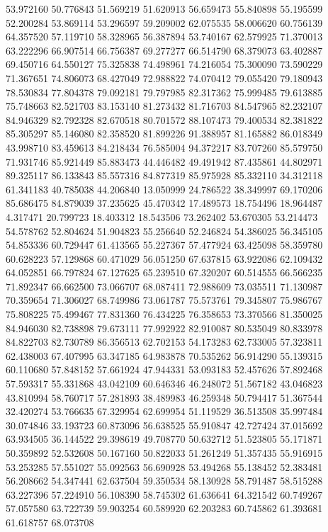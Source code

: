 53.972160
50.776843
51.569219
51.620913
56.659473
55.840898
55.195599
52.200284
53.869114
53.296597
59.209002
62.075535
58.006620
60.756139
64.357520
57.119710
58.328965
56.387894
53.740167
62.579925
71.370013
63.222296
66.907514
66.756387
69.277277
66.514790
68.379073
63.402887
69.450716
64.550127
75.325838
74.498961
74.216054
75.300090
73.590229
71.367651
74.806073
68.427049
72.988822
74.070412
79.055420
79.180943
78.530834
77.804378
79.092181
79.797985
82.317362
75.999485
79.613885
75.748663
82.521703
83.153140
81.273432
81.716703
84.547965
82.232107
84.946329
82.792328
82.670518
80.701572
88.107473
79.400534
82.381822
85.305297
85.146080
82.358520
81.899226
91.388957
81.165882
86.018349
43.998710
83.459613
84.218434
76.585004
94.372217
83.707260
85.579750
71.931746
85.921449
85.883473
44.446482
49.491942
87.435861
44.802971
89.325117
86.133843
85.557316
84.877319
85.975928
85.332110
34.312118
61.341183
40.785038
44.206840
13.050999
24.786522
38.349997
69.170206
85.686475
84.879039
37.235625
45.470342
17.489573
18.754496
18.964487
4.317471
20.799723
18.403312
18.543506
73.262402
53.670305
53.214473
54.578762
52.804624
51.904823
55.256640
52.246824
54.386025
56.345105
54.853336
60.729447
61.413565
55.227367
57.477924
63.425098
58.359780
60.628223
57.129868
60.471029
56.051250
67.637815
63.922086
62.109432
64.052851
66.797824
67.127625
65.239510
67.320207
60.514555
66.566235
71.892347
66.662500
73.066707
68.087411
72.988609
73.035511
71.130987
70.359654
71.306027
68.749986
73.061787
75.573761
79.345807
75.986767
75.808225
75.499467
77.831360
76.434225
76.358653
73.370566
81.350025
84.946030
82.738898
79.673111
77.992922
82.910087
80.535049
80.833978
84.822703
82.730789
86.356513
62.702153
54.173283
62.733005
57.323811
62.438003
67.407995
63.347185
64.983878
70.535262
56.914290
55.139315
60.110680
57.848152
57.661924
47.944331
53.093183
52.457626
57.892468
57.593317
55.331868
43.042109
60.646346
46.248072
51.567182
43.046823
43.810994
58.760717
57.281893
38.489983
46.259348
50.794417
51.367544
32.420274
53.766635
67.329954
62.699954
51.119529
36.513508
35.997484
30.074846
33.193723
60.873096
56.638525
55.910847
42.727424
37.015692
63.934505
36.144522
29.398619
49.708770
50.632712
51.523805
55.171871
50.359892
52.532608
50.167160
50.822033
51.261249
51.357435
55.916915
53.253285
57.551027
55.092563
56.690928
53.494268
55.138452
52.383481
56.208662
54.347441
62.637504
59.350534
58.130928
58.791487
58.515288
63.227396
57.224910
56.108390
58.745302
61.636641
64.321542
60.749267
57.057580
63.722739
59.903254
60.589920
62.203283
60.745862
61.393681
61.618757
68.073708

